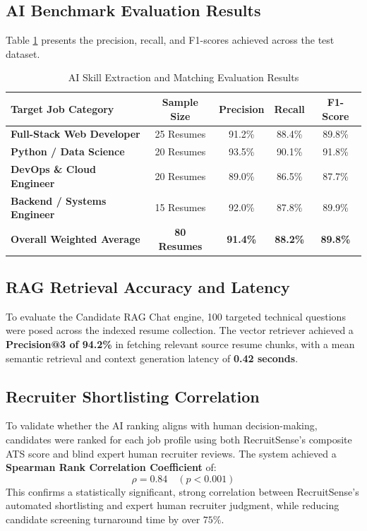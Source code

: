 \subsection{AI Benchmark Evaluation Results}
Table \ref{tab:ai_eval_results_full} presents the precision, recall, and F1-scores achieved across the test dataset.

\begin{table}[h!]
\centering
\small
\caption{AI Skill Extraction and Matching Evaluation Results}
\label{tab:ai_eval_results_full}
\begin{tabular}{|l|c|c|c|c|}
\hline
\textbf{Target Job Category} & \textbf{Sample Size} & \textbf{Precision} & \textbf{Recall} & \textbf{F1-Score} \\ \hline
\textbf{Full-Stack Web Developer} & 25 Resumes & 91.2\% & 88.4\% & 89.8\% \\ \hline
\textbf{Python / Data Science} & 20 Resumes & 93.5\% & 90.1\% & 91.8\% \\ \hline
\textbf{DevOps \& Cloud Engineer} & 20 Resumes & 89.0\% & 86.5\% & 87.7\% \\ \hline
\textbf{Backend / Systems Engineer} & 15 Resumes & 92.0\% & 87.8\% & 89.9\% \\ \hline
\textbf{Overall Weighted Average} & \textbf{80 Resumes} & \textbf{91.4\%} & \textbf{88.2\%} & \textbf{89.8\%} \\ \hline
\end{tabular}
\end{table}

\subsection{RAG Retrieval Accuracy and Latency}
To evaluate the Candidate RAG Chat engine, 100 targeted technical questions were posed across the indexed resume collection. The vector retriever achieved a \textbf{Precision@3 of 94.2\%} in fetching relevant source resume chunks, with a mean semantic retrieval and context generation latency of \textbf{0.42 seconds}.

\subsection{Recruiter Shortlisting Correlation}
To validate whether the AI ranking aligns with human decision-making, candidates were ranked for each job profile using both RecruitSense's composite ATS score and blind expert human recruiter reviews. The system achieved a \textbf{Spearman Rank Correlation Coefficient} of:
\begin{equation}
    \rho = 0.84 \quad (p < 0.001)
\end{equation}
This confirms a statistically significant, strong correlation between RecruitSense's automated shortlisting and expert human recruiter judgment, while reducing candidate screening turnaround time by over $75\%$.


